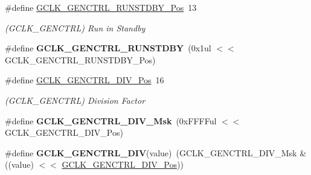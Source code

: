 \begin{DoxyCompactItemize}
\item 
\hypertarget{group___s_a_m_l21___g_c_l_k_ga74904f6bd2b8ead6cfffae549a41b869}{}\#define \hyperlink{group___s_a_m_l21___g_c_l_k_ga74904f6bd2b8ead6cfffae549a41b869}{G\+C\+L\+K\+\_\+\+G\+E\+N\+C\+T\+R\+L\+\_\+\+R\+U\+N\+S\+T\+D\+B\+Y\+\_\+\+Pos}~13\label{group___s_a_m_l21___g_c_l_k_ga74904f6bd2b8ead6cfffae549a41b869}

\begin{DoxyCompactList}\small\item\em (G\+C\+L\+K\+\_\+\+G\+E\+N\+C\+T\+R\+L) Run in Standby \end{DoxyCompactList}\item 
\hypertarget{group___s_a_m_l21___g_c_l_k_ga892b6d79b97157d48d189804f91df4fa}{}\#define {\bfseries G\+C\+L\+K\+\_\+\+G\+E\+N\+C\+T\+R\+L\+\_\+\+R\+U\+N\+S\+T\+D\+B\+Y}~(0x1ul $<$$<$ G\+C\+L\+K\+\_\+\+G\+E\+N\+C\+T\+R\+L\+\_\+\+R\+U\+N\+S\+T\+D\+B\+Y\+\_\+\+Pos)\label{group___s_a_m_l21___g_c_l_k_ga892b6d79b97157d48d189804f91df4fa}

\item 
\hypertarget{group___s_a_m_l21___g_c_l_k_gaddce74042a3293ef5f793a440fe49a17}{}\#define \hyperlink{group___s_a_m_l21___g_c_l_k_gaddce74042a3293ef5f793a440fe49a17}{G\+C\+L\+K\+\_\+\+G\+E\+N\+C\+T\+R\+L\+\_\+\+D\+I\+V\+\_\+\+Pos}~16\label{group___s_a_m_l21___g_c_l_k_gaddce74042a3293ef5f793a440fe49a17}

\begin{DoxyCompactList}\small\item\em (G\+C\+L\+K\+\_\+\+G\+E\+N\+C\+T\+R\+L) Division Factor \end{DoxyCompactList}\item 
\hypertarget{group___s_a_m_l21___g_c_l_k_ga68bf5f241419ffba5c88ef10c0f74d9f}{}\#define {\bfseries G\+C\+L\+K\+\_\+\+G\+E\+N\+C\+T\+R\+L\+\_\+\+D\+I\+V\+\_\+\+Msk}~(0x\+F\+F\+F\+Ful $<$$<$ G\+C\+L\+K\+\_\+\+G\+E\+N\+C\+T\+R\+L\+\_\+\+D\+I\+V\+\_\+\+Pos)\label{group___s_a_m_l21___g_c_l_k_ga68bf5f241419ffba5c88ef10c0f74d9f}

\item 
\hypertarget{group___s_a_m_l21___g_c_l_k_ga755702e72a256e504c07fa48b2520b83}{}\#define {\bfseries G\+C\+L\+K\+\_\+\+G\+E\+N\+C\+T\+R\+L\+\_\+\+D\+I\+V}(value)~(G\+C\+L\+K\+\_\+\+G\+E\+N\+C\+T\+R\+L\+\_\+\+D\+I\+V\+\_\+\+Msk \& ((value) $<$$<$ \hyperlink{group___s_a_m_l21___g_c_l_k_gaddce74042a3293ef5f793a440fe49a17}{G\+C\+L\+K\+\_\+\+G\+E\+N\+C\+T\+R\+L\+\_\+\+D\+I\+V\+\_\+\+Pos}))\label{group___s_a_m_l21___g_c_l_k_ga755702e72a256e504c07fa48b2520b83}


\end{DoxyCompactItemize}
